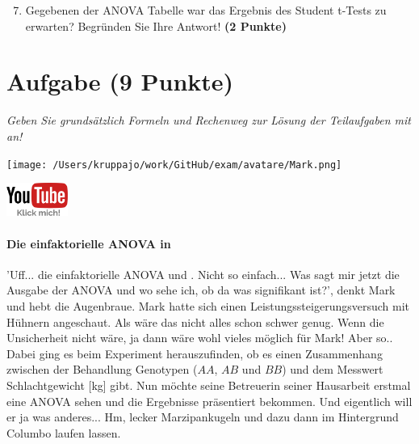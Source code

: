 \documentclass[a4paper, 9pt]{scrartcl}\usepackage[]{graphicx}\usepackage[]{xcolor}
\begin{document}
\begin{enumerate}
  \setcounter{enumi}{6}
\item Gegebenen der ANOVA Tabelle war das Ergebnis des Student t-Tests zu erwarten? Begründen Sie Ihre Antwort! \textbf{(2 Punkte)}
\end{enumerate}

 
\clearpage

\section{Aufgabe \hfill (9 Punkte)}

\textit{Geben Sie grundsätzlich Formeln und Rechenweg zur Lösung der Teilaufgaben mit an!} \\[1Ex]
 

 
\begin{minipage}[t]{0.5\textwidth}
\texttt{[image: /Users/kruppajo/work/GitHub/exam/avatare/Mark.png]}
\end{minipage}
\begin{minipage}[t]{0.5\textwidth}
\hfill
\href{https://youtu.be/aXvxGC4YLqk}{\includegraphics[width = 2cm]{img/youtube}}
\end{minipage}
\vspace{-3Ex}



\paragraph{Die einfaktorielle ANOVA in \Rlogo}

'Uff... die einfaktorielle ANOVA und \Rlogo. Nicht so einfach... Was sagt mir jetzt die Ausgabe der ANOVA und wo sehe ich, ob da was signifikant ist?', denkt Mark und hebt die Augenbraue. Mark hatte sich einen Leistungssteigerungsversuch mit Hühnern angeschaut. Als wäre das nicht alles schon schwer genug. Wenn die Unsicherheit nicht wäre, ja dann wäre wohl vieles möglich für Mark! Aber so.. Dabei ging es beim Experiment herauszufinden, ob es einen Zusammenhang zwischen der Behandlung Genotypen ($AA$, $AB$ und $BB$) und dem Messwert Schlachtgewicht [kg] gibt. Nun möchte seine Betreuerin seiner Hausarbeit erstmal eine ANOVA sehen und die Ergebnisse präsentiert bekommen. Und eigentlich will er ja was anderes... Hm, lecker Marzipankugeln und dazu dann im Hintergrund Columbo laufen lassen.
\end{document}
